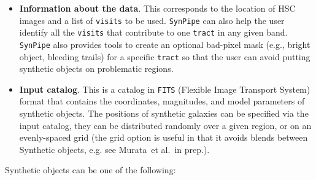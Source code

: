 \documentclass[useamsfonts]{pasj01}
\def\etal{{\ et al.~}}
\def\synpipe{\texttt{SynPipe}}
\def\tract{\texttt{tract}}
\def\visits{\texttt{visits}}
\begin{document}
    \begin{itemize}

        \item \textbf{Information about the data}. 
            This  corresponds to the location of HSC images and a list of \visits{} to 
            be used. 
            \synpipe{} can also help the user identify all the \visits{} that contribute 
            to one \tract{} in any given band.
            \synpipe{} also provides tools to create an optional bad-pixel mask
            (e.g., bright object, bleeding trails) for a specific \tract{} so that
            the user can avoid putting synthetic objects on problematic regions.

        \item \textbf{Input catalog}. 
            This is a catalog in \texttt{FITS} (Flexible Image Transport System)
            format that contains the coordinates, magnitudes, and model parameters of 
            synthetic objects.  
            The positions of synthetic galaxies can be specified via the input catalog, 
            they can be distributed randomly over a given region, or on an 
            evenly-spaced grid (the grid option is useful in that it avoids blends 
            between Synthetic objects, e.g. see Murata\etal in prep.).  
            
    \end{itemize}

    \vspace{0.5cm}
    \noindent Synthetic objects can be one of the following:
\end{document}
